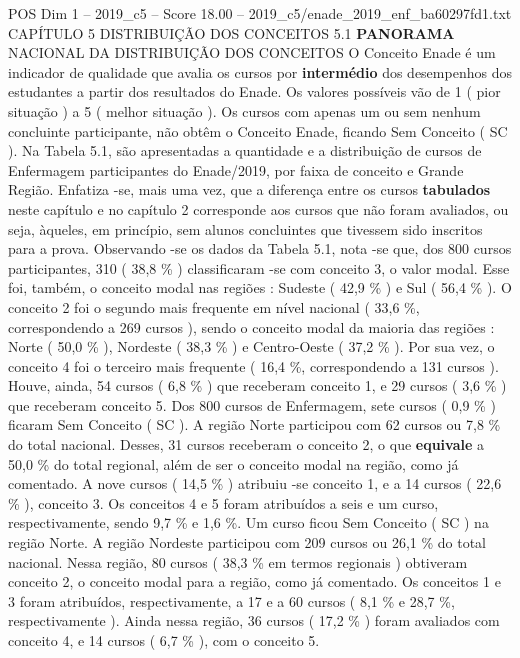 \begin{textsample}{POS Dim 1 – 2019\_c5 – Score 18.00 – 2019\_c5/enade\_2019\_enf\_ba60297fd1.txt}  \label{ex:f1_pos_043}
CAPÍTULO 5 DISTRIBUIÇÃO DOS CONCEITOS 5.1 \textbf{PANORAMA} NACIONAL DA DISTRIBUIÇÃO DOS CONCEITOS O Conceito Enade é um indicador de qualidade que avalia os cursos por \textbf{intermédio} dos desempenhos dos estudantes a partir dos resultados do Enade.
Os valores possíveis vão de 1 ( pior situação ) a 5 ( melhor situação ).
Os cursos com apenas um ou sem nenhum concluinte participante, não obtêm o Conceito Enade, ficando Sem Conceito ( SC ).
Na Tabela 5.1, são apresentadas a quantidade e a distribuição de cursos de Enfermagem participantes do Enade/2019, por faixa de conceito e Grande Região.
Enfatiza -se, mais uma vez, que a diferença entre os cursos \textbf{tabulados} neste capítulo e no capítulo 2 corresponde aos cursos que não foram avaliados, ou seja, àqueles, em princípio, sem alunos concluintes que tivessem sido inscritos para a prova.
Observando -se os dados da Tabela 5.1, nota -se que, dos 800 cursos participantes, 310 ( 38,8 \% ) classificaram -se com conceito 3, o valor modal.
Esse foi, também, o conceito modal nas regiões : Sudeste ( 42,9 \% ) e Sul ( 56,4 \% ).
O conceito 2 foi o segundo mais frequente em nível nacional ( 33,6 \%, correspondendo a 269 cursos ), sendo o conceito modal da maioria das regiões : Norte ( 50,0 \% ), Nordeste ( 38,3 \% ) e Centro-Oeste ( 37,2 \% ).
Por sua vez, o conceito 4 foi o terceiro mais frequente ( 16,4 \%, correspondendo a 131 cursos ).
Houve, ainda, 54 cursos ( 6,8 \% ) que receberam conceito 1, e 29 cursos ( 3,6 \% ) que receberam conceito 5.
Dos 800 cursos de Enfermagem, sete cursos ( 0,9 \% ) ficaram Sem Conceito ( SC ).
A região Norte participou com 62 cursos ou 7,8 \% do total nacional.
Desses, 31 cursos receberam o conceito 2, o que \textbf{equivale} a 50,0 \% do total regional, além de ser o conceito modal na região, como já comentado.
A nove cursos ( 14,5 \% ) atribuiu -se conceito 1, e a 14 cursos ( 22,6 \% ), conceito 3.
Os conceitos 4 e 5 foram atribuídos a seis e um curso, respectivamente, sendo 9,7 \% e 1,6 \%.
Um curso ficou Sem Conceito ( SC ) na região Norte.
A região Nordeste participou com 209 cursos ou 26,1 \% do total nacional.
Nessa região, 80 cursos ( 38,3 \% em termos regionais ) obtiveram conceito 2, o conceito modal para a região, como já comentado.
Os conceitos 1 e 3 foram atribuídos, respectivamente, a 17 e a 60 cursos ( 8,1 \% e 28,7 \%, respectivamente ).
Ainda nessa região, 36 cursos ( 17,2 \% ) foram avaliados com conceito 4, e 14 cursos ( 6,7 \% ), com o conceito 5.

\end{textsample}
